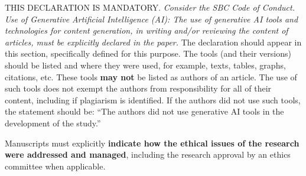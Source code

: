 \documentclass[english]{sbc2025}%
\begin{document}
\begin{declarations}
\begin{aitools}
THIS DECLARATION IS MANDATORY. 
\textit{Consider the SBC Code of Conduct.
Use of Generative Artificial Intelligence (AI):
The use of generative AI tools and technologies for content generation,
in writing and/or reviewing the content of articles, must be explicitly declared in the paper.}
The declaration should appear in this section, specifically defined for this purpose.
The tools (and their versions) should be listed and where they were used, for example,
texts, tables, graphs, citations, etc.
These tools \textbf{may not} be listed as authors of an article.
The use of such tools does not exempt the authors from responsibility
for all of their content, including if plagiarism is identified.
%
If the authors did not use such tools, the statement should be:
``The authors did not use generative AI tools in the development of the study.''
\end{aitools}

\begin{furtherinformation}
Manuscripts must explicitly 
\textbf{indicate how the ethical issues of the research were addressed and managed}, 
including the research approval by an ethics committee when applicable. 
\end{furtherinformation}

\end{declarations}



\end{document}
